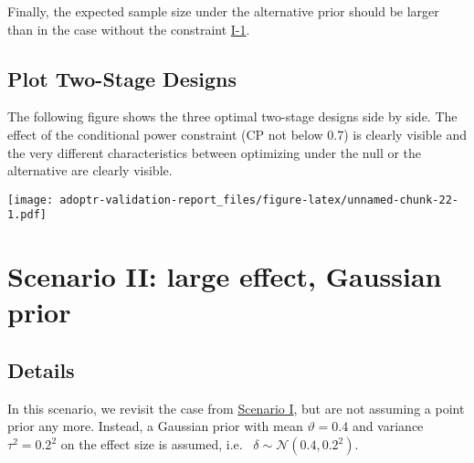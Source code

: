 \documentclass[
]{book}
\newenvironment{Shaded}{\begin{snugshade}}{\end{snugshade}}
\newcommand{\DecValTok}[1]{\textcolor[rgb]{0.00,0.00,0.81}{#1}}
\newcommand{\KeywordTok}[1]{\textcolor[rgb]{0.13,0.29,0.53}{\textbf{#1}}}
\newcommand{\NormalTok}[1]{#1}
\newcommand{\OperatorTok}[1]{\textcolor[rgb]{0.81,0.36,0.00}{\textbf{#1}}}
\newcommand{\StringTok}[1]{\textcolor[rgb]{0.31,0.60,0.02}{#1}}
\begin{document}
Finally, the expected sample size under the alternative prior should
be larger than in the case without the constraint \protect\hyperlink{variantI_1}{I-1}.

\begin{Shaded}
\end{Shaded}

\hypertarget{plot-two-stage-designs}{%
\section{Plot Two-Stage Designs}\label{plot-two-stage-designs}}

The following figure shows the three optimal two-stage designs side by
side.
The effect of the conditional power constraint (CP not below 0.7) is
clearly visible and the very different characteristics between
optimizing under the null or the alternative are clearly visible.

\texttt{[image: adoptr-validation-report\_files/figure-latex/unnamed-chunk-22-1.pdf]}

\hypertarget{scenarioII}{%
\chapter{Scenario II: large effect, Gaussian prior}\label{scenarioII}}

\hypertarget{details-1}{%
\section{Details}\label{details-1}}

In this scenario, we revisit the case from \protect\hyperlink{scenarioI}{Scenario I}, but
are not assuming a point prior any more.
Instead, a Gaussian prior with mean \(\vartheta = 0.4\) and
variance \(\tau^2 = 0.2^2\) on the effect size is assumed, i.e.~
\(\delta \sim \mathcal{N} (0.4, 0.2^2)\).
\end{document}

